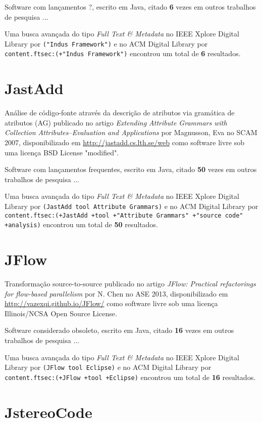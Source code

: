 Software com lançamentos ?,
escrito em Java,
citado {\bf 6} vezes em outros trabalhos de pesquisa ...

Uma busca avançada do tipo {\it Full Text \& Metadata} no IEEE Xplore Digital Library por
\texttt{("Indus Framework")}
e no ACM Digital Library por
\texttt{content.ftsec:(+"Indus Framework")}
encontrou um total de
{\bf 6}
resultados.

\section{JastAdd}

Análise de código-fonte através da descrição de atributos via gramática de atributos (AG)
publicado no artigo {\it Extending Attribute Grammars with Collection Attributes--Evaluation and Applications}
por Magnusson, Eva
no SCAM 2007,
disponibilizado em \url{http://jastadd.cs.lth.se/web}
como software livre
sob uma licença BSD License "modified".

Software com lançamentos frequentes,
escrito em Java,
citado {\bf 50} vezes em outros trabalhos de pesquisa ...

Uma busca avançada do tipo {\it Full Text \& Metadata} no IEEE Xplore Digital Library por
\texttt{(JastAdd tool Attribute Grammars)}
e no ACM Digital Library por
\texttt{content.ftsec:(+JastAdd +tool +"Attribute Grammars" +"source code" +analysis)}
encontrou um total de
{\bf 50}
resultados.

\section{JFlow}

Transformação source-to-source
publicado no artigo {\it JFlow: Practical refactorings for flow-based parallelism}
por N. Chen
no ASE 2013,
disponibilizado em \url{http://vazexqi.github.io/JFlow/}
como software livre
sob uma licença Illinois/NCSA Open Source License.

Software considerado obsoleto,
escrito em Java,
citado {\bf 16} vezes em outros trabalhos de pesquisa ...

Uma busca avançada do tipo {\it Full Text \& Metadata} no IEEE Xplore Digital Library por
\texttt{(JFlow tool Eclipse)}
e no ACM Digital Library por
\texttt{content.ftsec:(+JFlow +tool +Eclipse)}
encontrou um total de
{\bf 16}
resultados.

\section{JstereoCode}


